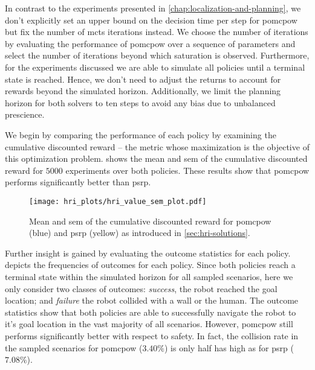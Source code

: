 In contrast to the experiments presented in
\cref{chap:localization-and-planning}, we don't explicitly set an upper bound
on the decision time per step for \ac{pomcpow} but fix the number of
\ac{mcts} iterations instead. We choose the number of iterations by evaluating the
performance of \ac{pomcpow} over a sequence of parameters and select the number
of iterations beyond which saturation is observed. Furthermore, for the
experiments discussed we are able to simulate all policies until a terminal
state is reached. Hence, we don't need to adjust the returns to account for
rewards beyond the simulated horizon. Additionally, we limit the planning horizon
for both solvers to ten steps to avoid any bias due to unbalanced prescience.

We begin by comparing the performance of each policy by examining the
cumulative discounted reward -- the metric whose maximization is the objective
of this optimization problem.  shows the mean and
\ac{sem} of the cumulative discounted reward for $5000$ experiments over both
policies. These results show that \ac{pomcpow} performs significantly better
than \ac{psrp}.

\begin{figure}[htpb]
  \centering
  \texttt{[image: hri\_plots/hri\_value\_sem\_plot.pdf]}
  \caption{Mean and \acf{sem} of the cumulative discounted reward for
  \ac{pomcpow} (blue) and \ac{psrp} (yellow) as introduced in \cref{sec:hri-solutions}.}
  \label{fig:hri_eval_value_sem}
\end{figure}

Further insight is gained by evaluating the outcome statistics for each policy.
 depicts the frequencies of outcomes for each
policy. Since both policies reach a terminal state within the simulated horizon
for all sampled scenarios, here we only consider two classes of outcomes:
\emph{success}, the robot reached the goal location; and \emph{failure} the
robot collided with a wall or the human. The outcome statistics show that both
policies are able to successfully navigate the robot to it's goal location in
the vast majority of all scenarios. However, \ac{pomcpow} still performs
significantly better with respect to safety. In fact, the collision rate in the
sampled scenarios for \ac{pomcpow} ($3.40\%$) is only half has high as for
\ac{psrp} ($7.08\%$).


